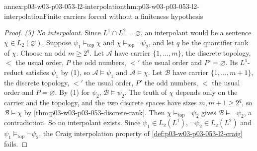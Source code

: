 \begin{annexitem}{annex:p03-w03-p03-053-l2-interpolation}{thm:p03-w03-p03-053-l2-interpolation}{Finite carriers forced without a finiteness hypothesis}
\begin{proof}
\emph{(3) No interpolant.} Since \(L^1\cap L^2=\varnothing\), an
interpolant would be a sentence \(\chi\in L_2(\varnothing)\). Suppose
\(\psi_1\models_{\mathrm{top}}\chi\) and
\(\chi\models_{\mathrm{top}}\neg\psi_2\), and let \(q\) be the quantifier
rank of \(\chi\). Choose an odd \(m\ge2^q\). Let \(\mathcal A\) have carrier
\(\{1,\ldots,m\}\), the discrete topology, \(<\) the usual order, \(P\) the
odd numbers, \(<'\) the usual order and \(P'=\varnothing\). Its
\(L^1\)-reduct satisfies \(\psi_1\) by (1), so \(\mathcal A\models\psi_1\)
and \(\mathcal A\models\chi\). Let \(\mathcal B\) have carrier
\(\{1,\ldots,m+1\}\), the discrete topology, \(<'\) the usual order,
\(P'\) the odd numbers, \(<\) the usual order and \(P=\varnothing\). By
(1) for \(\psi_2\), \(\mathcal B\models\psi_2\). The truth of \(\chi\)
depends only on the carrier and the topology, and the two discrete spaces
have sizes \(m,m+1\ge2^q\), so \(\mathcal B\models\chi\) by
\cref{thm:p03-w03-p03-053-discrete-rank}. Then
\(\chi\models_{\mathrm{top}}\neg\psi_2\) gives
\(\mathcal B\models\neg\psi_2\), a contradiction. So no interpolant
exists. Since \(\psi_1\in L_2(L^1)\), \(\neg\psi_2\in L_2(L^2)\) and
\(\psi_1\models_{\mathrm{top}}\neg\psi_2\), the Craig interpolation
property of \cref{def:p03-w03-p03-053-l2-craig} fails.
\end{proof}
\end{annexitem}
